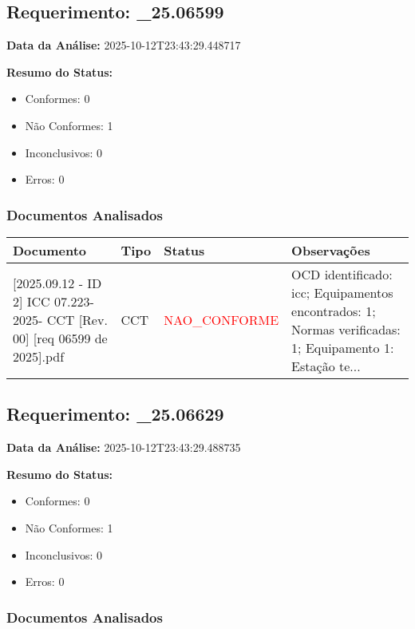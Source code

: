 \documentclass[12pt,a4paper]{article}
\begin{document}
\subsection{Requerimento: \_25.06599}

\textbf{Data da Análise:} 2025-10-12T23:43:29.448717

\textbf{Resumo do Status:}
\begin{itemize}
    \item Conformes: 0
    \item Não Conformes: 1
    \item Inconclusivos: 0
    \item Erros: 0
\end{itemize}

\subsubsection{Documentos Analisados}

\begin{longtable}{|p{4cm}|p{2cm}|p{2cm}|p{6cm}|}
\hline
\textbf{Documento} & \textbf{Tipo} & \textbf{Status} & \textbf{Observações} \\
\hline
\endhead
[Certificado de Conformidade Técnica - CCT][2025.09.12 - ID 2] ICC 07.223-2025- CCT [Rev. 00] [req 06599 de 2025].pdf & CCT & \textcolor{red}{NAO\_CONFORME} & OCD identificado: icc; Equipamentos encontrados: 1; Normas verificadas: 1; Equipamento 1: Estação te... \\
\hline
\end{longtable}


\subsection{Requerimento: \_25.06629}

\textbf{Data da Análise:} 2025-10-12T23:43:29.488735

\textbf{Resumo do Status:}
\begin{itemize}
    \item Conformes: 0
    \item Não Conformes: 1
    \item Inconclusivos: 0
    \item Erros: 0
\end{itemize}

\subsubsection{Documentos Analisados}
\end{document}
